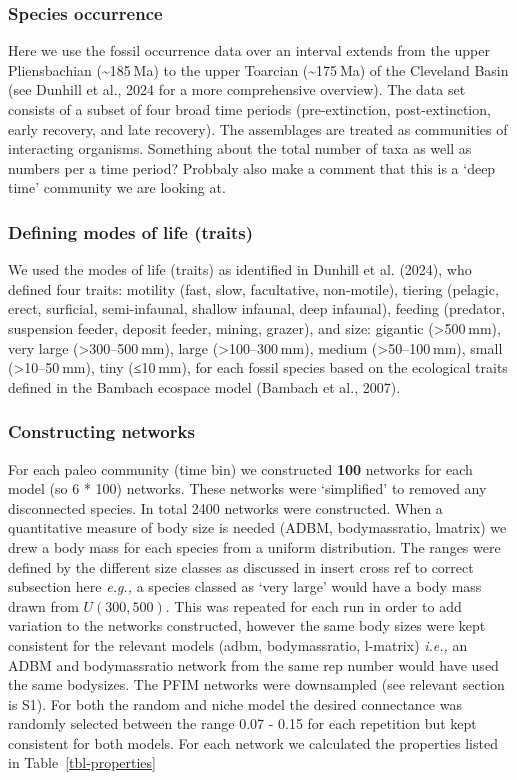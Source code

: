 \documentclass[
]{article}
\begin{document}
\subsubsection{Species occurrence}\label{species-occurrence}

Here we use the fossil occurrence data over an interval extends from the
upper Pliensbachian (\textasciitilde185 Ma) to the upper Toarcian
(\textasciitilde175 Ma) of the Cleveland Basin (see Dunhill et al., 2024
for a more comprehensive overview). The data set consists of a subset of
four broad time periods (pre-extinction, post-extinction, early
recovery, and late recovery). The assemblages are treated as communities
of interacting organisms. Something about the total number of taxa as
well as numbers per a time period? Probbaly also make a comment that
this is a `deep time' community we are looking at.

\subsubsection{Defining modes of life
(traits)}\label{defining-modes-of-life-traits}

We used the modes of life (traits) as identified in Dunhill et al.
(2024), who defined four traits: motility (fast, slow, facultative,
non-motile), tiering (pelagic, erect, surficial, semi-infaunal, shallow
infaunal, deep infaunal), feeding (predator, suspension feeder, deposit
feeder, mining, grazer), and size: gigantic (\textgreater500 mm), very
large (\textgreater300--500 mm), large (\textgreater100--300 mm), medium
(\textgreater50--100 mm), small (\textgreater10--50 mm), tiny (≤10 mm),
for each fossil species based on the ecological traits defined in the
Bambach ecospace model (Bambach et al., 2007).

\subsubsection{Constructing networks}\label{constructing-networks}

For each paleo community (time bin) we constructed \textbf{100} networks
for each model (so 6 * 100) networks. These networks were `simplified'
to removed any disconnected species. In total 2400 networks were
constructed. When a quantitative measure of body size is needed (ADBM,
bodymassratio, lmatrix) we drew a body mass for each species from a
uniform distribution. The ranges were defined by the different size
classes as discussed in insert cross ref to correct subsection here
\emph{e.g.,} a species classed as `very large' would have a body mass
drawn from \(U(300, 500)\). This was repeated for each run in order to
add variation to the networks constructed, however the same body sizes
were kept consistent for the relevant models (adbm, bodymassratio,
l-matrix) \emph{i.e.,} an ADBM and bodymassratio network from the same
rep number would have used the same bodysizes. The PFIM networks were
downsampled (see relevant section is S1). For both the random and niche
model the desired connectance was randomly selected between the range
0.07 - 0.15 for each repetition but kept consistent for both models. For
each network we calculated the properties listed in
Table~\ref{tbl-properties}
\end{document}
